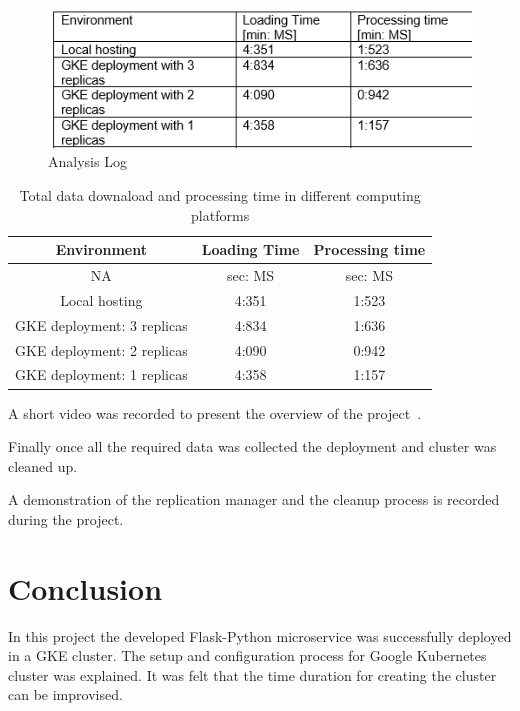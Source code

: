 \begin{figure}[htb]
	\centering\includegraphics[width=\columnwidth]{images/hid_417_benchmark.png}
  \caption{Analysis Log}
  \label{fig:project_benchmark}
\end{figure}
\begin{table}[htb]
	\centering
	\caption{Total data downaload and processing time in different computing platforms}\label{tab:performance}
	\begin{tabular}{*{3}{c}}
		\toprule
		Environment & Loading Time  &  Processing time \\
		\midrule
		NA & sec: MS & sec: MS \\
		\midrule
		Local hosting & 4:351  & 1:523 \\
		GKE deployment: 3 replicas & 4:834 & 1:636 \\
    GKE deployment: 2 replicas & 4:090 & 0:942 \\
    GKE deployment: 1 replicas & 4:358 & 1:157 \\


		\bottomrule
	\end{tabular}
\end{table}

A short video was recorded to present the overview of the
project~\cite{hid-sp18-417-project_overview}.

Finally once all the required data was collected the deployment and cluster
was cleaned up.

A demonstration of the replication manager and the cleanup process is
  recorded~\cite{hid-sp18-417-google_cleanup} during the project.
\section{Conclusion}


In this project the developed Flask-Python microservice was successfully
deployed in a GKE cluster. The setup and configuration process for Google
Kubernetes cluster was explained. It was felt that the time duration for
creating the cluster can be improvised.

